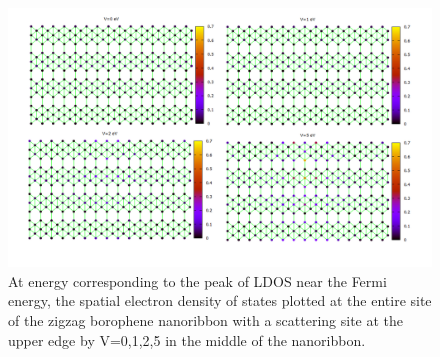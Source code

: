 \begin{figure}[!ht]
    \centering
    \includegraphics[width=1\linewidth]{./figures/Slide1.PNG}
    \caption{At energy corresponding to the peak of LDOS near the Fermi energy, the spatial electron density of states plotted at the entire site of the zigzag borophene nanoribbon 
    with a scattering site at the upper edge by V=0,1,2,5 in the middle of the nanoribbon.}
    \label{zigCSLDOS}
  \end{figure}

